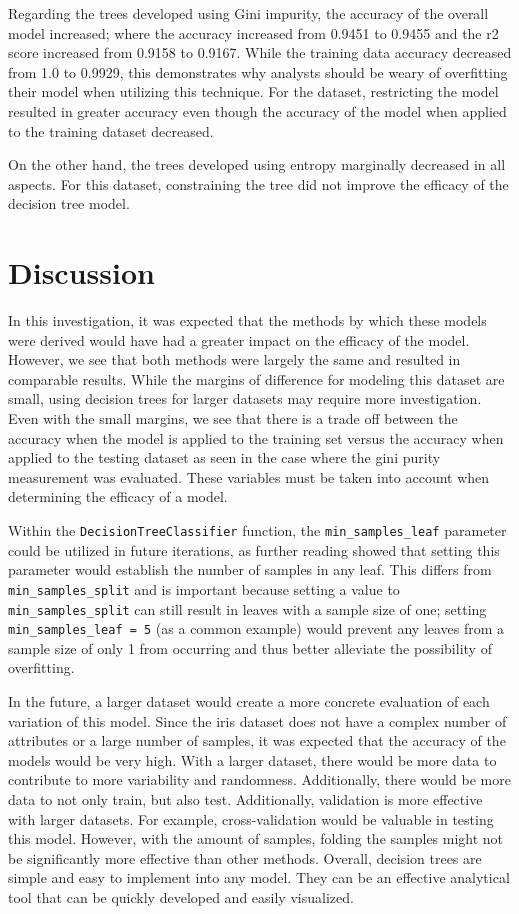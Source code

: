 \documentclass[journal]{IEEEtran}
\begin{document}
Regarding the trees developed using Gini impurity, the accuracy of the overall model increased; where the accuracy increased from 0.9451 to 0.9455 and the r2 score increased from 0.9158 to 0.9167. While the training data accuracy decreased from 1.0 to 0.9929, this demonstrates why analysts should be weary of overfitting their model when utilizing this technique. For the dataset, restricting the model resulted in greater accuracy even though the accuracy of the model when applied to the training dataset decreased.

On the other hand, the trees developed using entropy marginally decreased in all aspects. For this dataset, constraining the tree did not improve the efficacy of the decision tree model.


\section{Discussion}

In this investigation, it was expected that the methods by which these models were derived would have had a greater impact on the efficacy of the model. However, we see that both methods were largely the same and resulted in comparable results. While the margins of difference for modeling this dataset are small, using decision trees for larger datasets may require more investigation. Even with the small margins, we see that there is a trade off between the accuracy when the model is applied to the training set versus the accuracy when applied to the testing dataset as seen in the case where the gini purity measurement was evaluated. These variables must be taken into account when determining the efficacy of a model. 

Within the \lstinline{DecisionTreeClassifier} function, the \lstinline{min_samples_leaf} parameter could be utilized in future iterations, as further reading showed that setting this parameter would establish the number of samples in any leaf. This differs from \lstinline{min_samples_split} and is important because setting a value to \lstinline{min_samples_split} can still result in leaves with a sample size of one; setting \lstinline{min_samples_leaf = 5} (as a common example) would prevent any leaves from a sample size of only 1 from occurring and thus better alleviate the possibility of overfitting.

In the future, a larger dataset would create a more concrete evaluation of each variation of this model. Since the iris dataset does not have a complex number of attributes or a large number of  samples, it was expected that the accuracy of the models would be very high. With a larger dataset, there would be more data to contribute to more variability and randomness. Additionally, there would be more data to not only train, but also test. Additionally, validation is more effective with larger datasets. For example, cross-validation \cite{b5} would be valuable in testing this model. However, with the amount of samples, folding the samples might not be significantly more effective than other methods. Overall, decision trees are simple and easy to implement into any model. They can be an effective analytical tool that can be quickly developed and easily visualized. 
\end{document}

